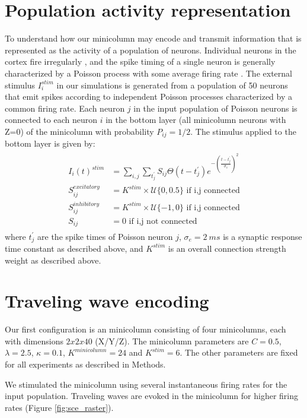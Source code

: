 \section{Population activity representation}
To understand how our minicolumn may encode and transmit information that is represented as the activity of a population of neurons.
Individual neurons in the cortex fire irregularly \citep{Maimon2009}, and the spike timing of a single neuron is generally characterized by a Poisson process with some average firing rate \citep{Gerstein1964}.
The external stimulus $I_i^{stim}$ in our simulations is generated from a population of 50 neurons that emit spikes according to independent Poisson processes characterized by a common firing rate.
Each neuron $j$ in the input population of Poisson neurons is connected to each neuron $i$ in the bottom layer (all minicolumn neurons with Z=0) of the minicolumn with probability $P_{ij} = 1/2$.
The stimulus applied to the bottom layer is given by:
\begin{align}
 \begin{split}
  I_i(t)^{stim} &= \sum_{i,j} \sum_{t^\prime_j} S_{ij}  \Theta(t-t^\prime_j)e^{-(\frac{t-t^\prime_j}{\sigma_e})^2}\\
  S_{ij}^{excitatory} &= K^{stim} \times \mathcal{U}\{0,0.5 \} \text{ if i,j connected}\\
  S_{ij}^{inhibitory} &= K^{stim} \times \mathcal{U}\{-1,0 \} \text{ if i,j connected}\\
  S_{ij} &= 0 \text{ if i,j not connected}
 \end{split}
\end{align}
where $t^\prime_j$ are the spike times of Poisson neuron $j$, $\sigma_e=2\ ms$ is a synaptic response time constant as described above, and $K^{stim}$ is an overall connection strength weight as described above.


\section{Traveling wave encoding}
Our first configuration is an minicolumn consisting of four minicolumns, each with dimensions $2x2x40$ (X/Y/Z).
The minicolumn parameters are $C=0.5$, $\lambda=2.5$, $\kappa=0.1$, $K^{minicolumn}=24$ and $K^{stim}=6$.
The other parameters are fixed for all experiments as described in Methods.

We stimulated the minicolumn using several instantaneous firing rates for the input population.
Traveling waves are evoked in the minicolumn for higher firing rates (Figure \ref{fig:sce_raster}).

